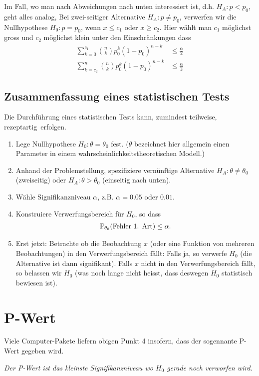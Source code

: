 Im Fall, wo man nach Abweichungen nach unten interessiert ist, d.h. $H_A: p<p_0$, geht alles analog, Bei zwei-seitiger Alternative $H_A:p\neq p_0$, verwerfen wir die Nullhypothese $H_0:p=p_0$, wenn $x\leq c_1$ oder $x\geq c_2$. Hier wählt man $c_1$ möglichst gross und $c_2$ möglichst klein unter den Einschränkungen dass
\begin{align*}
	\sum_{k=0}^{c_1}{n\choose k}p_{0}^{k}(1-p_0)^{n-k}&\leq \frac{\alpha}{2}\\
	\sum_{k=c_2}^{n}{n\choose k}p_{0}^{k}(1-p_0)^{n-k}&\leq \frac{\alpha}{2}
\end{align*}
\subsection{Zusammenfassung eines statistischen Tests}
Die Durchführung eines statistischen Tests kann, zumindest teilweise, \glqq rezeptartig\grqq\ erfolgen.
\begin{enumerate}[1.]
	\item Lege Nullhypothese $H_0: \theta=\theta_0$ fest. ($\theta$ bezeichnet hier allgemein einen Parameter in einem wahrscheinlichkeitstheoretischen Modell.)
	\item Anhand der Problemstellung, spezifiziere vernünftige Alternative $H_A:\theta\neq \theta_0$ (zweiseitig) oder $H_A:\theta> \theta_0$ (einseitig nach unten).
	\item Wähle Signifikanzniveau $\alpha$, z.B. $\alpha=0.05$ oder $0.01$.
	\item Konstruiere Verwerfungsbereich für $H_0$, so dass 
		\begin{gather*}
			\mathbb P_{\theta_0}(\text{Fehler 1. Art})\leq \alpha.
		\end{gather*}
	\item Erst jetzt: Betrachte ob die Beobachtung $x$ (oder eine Funktion von mehreren Beobachtungen) in den Verwerfungsbereich fällt: Falls ja, so verwerfe $H_0$ (die Alternative ist dann \glqq signifikant\grqq). Falls $x$ nicht in den Verwerfungsbereich fällt, so belassen wir $H_0$ (was noch lange nicht heisst, dass deswegen $H_0$ statistisch bewiesen ist).
\end{enumerate}
\section{P-Wert}
Viele Computer-Pakete liefern obigen Punkt 4 insofern, dass der sogennante P-Wert gegeben wird.

\emph{Der P-Wert ist das kleinste Signifikanzniveau wo $H_0$ gerade noch verworfen wird}.

